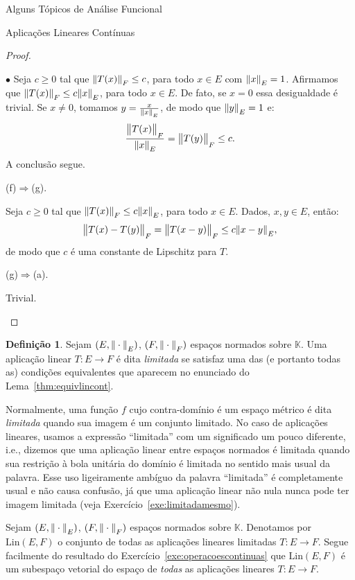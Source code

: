 \documentclass[oneside,final,11pt]{amsbook}
\newcommand{\K}{\mathds K}
\newcommand{\Lin}{\mathrm{Lin}}
\newcommand{\norma}[2]{\Vert#1\Vert_{\lower2pt\hbox{$\scriptstyle#2$}}}
\newcommand{\bignorma}[2]{\big\Vert#1\big\Vert_{\lower2pt\hbox{$\scriptstyle#2$}}}
\newcommand{\subnorma}[2]{\Vert#1\Vert_{\lower2pt\hbox{$\scriptscriptstyle#2$}}}
\newcounter{contador}
\newenvironment{bulletindent}{\setcounter{contador}{0}
\begin{list} {$\bullet$}
{\usecounter{contador}
\setlength{\leftmargin}{10pt}
\setlength{\rightmargin}{10pt}
\setlength{\labelsep}{5pt}
\setlength{\itemsep}{10pt}
\setlength{\topsep}{10pt}}}
{\end{list}}
\theoremstyle{remark}\newtheorem{exercise}{Exercício}[chapter]
\theoremstyle{remark}\newtheorem{*exercise}[exercise]{\hbox to 0pt{\hskip 0pt minus 1fil*}Exercício}
\theoremstyle{definition}\newtheorem{exdefin}{Definição}[chapter]
\theoremstyle{plain}\newtheorem{teo}{Teorema}[section]
\theoremstyle{plain}\newtheorem{lem}[teo]{Lema}
\theoremstyle{plain}\newtheorem{prop}[teo]{Proposição}
\theoremstyle{plain}\newtheorem{cor}[teo]{Corolário}
\theoremstyle{definition}\newtheorem{defin}[teo]{Definição}
\theoremstyle{remark}\newtheorem{rem}[teo]{Observação}
\theoremstyle{definition}\newtheorem{notation}[teo]{Notação}
\theoremstyle{definition}\newtheorem{convention}[teo]{Convenção}
\theoremstyle{definition}\newtheorem{example}[teo]{Exemplo}
\numberwithin{section}{chapter}
\numberwithin{equation}{section}
\begin{document}
\begin{chapter}{Alguns Tópicos de Análise Funcional}
\begin{section}{Aplicações Lineares Contínuas}
\begin{proof}
\begin{bulletindent}
Seja $c\ge0$ tal que $\norma{T(x)}F\le c$, para todo $x\in E$ com $\norma xE=1$. Afirmamos que
$\norma{T(x)}F\le c\norma xE$, para todo $x\in E$. De fato, se $x=0$ essa desigualdade é trivial. Se $x\ne0$,
tomamos $y=\frac x{\subnorma xE}$, de modo que $\norma yE=1$ e:
\[\frac{\bignorma{T(x)}F}{\norma xE}=\bignorma{T(y)}F\le c.\]
A conclusão segue.

\item (f)$\Rightarrow$(g).

Seja $c\ge0$ tal que $\norma{T(x)}F\le c\norma xE$, para todo $x\in E$. Dados, $x,y\in E$, então:
\[\bignorma{T(x)-T(y)}F=\bignorma{T(x-y)}F\le c\norma{x-y}E,\]
de modo que $c$ é uma constante de Lipschitz para $T$.

\item (g)$\Rightarrow$(a).

Trivial.\qedhere
\end{bulletindent}
\end{proof}

\begin{defin}
Sejam $(E,\norma\cdot E)$, $(F,\norma\cdot F)$ espaços normados sobre $\K$. Uma aplicação
linear $T:E\to F$ é dita {\em limitada\/}%
se satisfaz uma das (e portanto todas as) condições equivalentes
que aparecem no enunciado do Lema~\ref{thm:equivlincont}.
\end{defin}
Normalmente, uma função $f$ cujo contra-domínio é um espaço métrico é dita {\em limitada\/} quando sua imagem
é um conjunto limitado. No caso de aplicações lineares, usamos a expressão ``limitada'' com um significado
um pouco diferente, i.e., dizemos que uma aplicação linear entre espaços normados é limitada quando sua restrição
à bola unitária do domínio é limitada no sentido mais usual da palavra. Esse uso ligeiramente ambíguo da palavra
``limitada'' é completamente usual e não causa confusão, já que uma aplicação linear não nula nunca pode ter imagem
limitada (veja Exercício~\ref{exe:limitadamesmo}).

Sejam $(E,\norma\cdot E)$, $(F,\norma\cdot F)$ espaços normados sobre $\K$. Denotamos
por $\Lin(E,F)$\index[simbolos]{$\Lin(E,F)$} o conjunto de todas as aplicações lineares limitadas $T:E\to F$.
Segue facilmente do resultado do Exercício~\ref{exe:operacoescontinuas} que $\Lin(E,F)$ é um subespaço
vetorial do espaço de {\em todas\/} as aplicações lineares $T:E\to F$.


\end{section}
\end{chapter}
\end{document}
